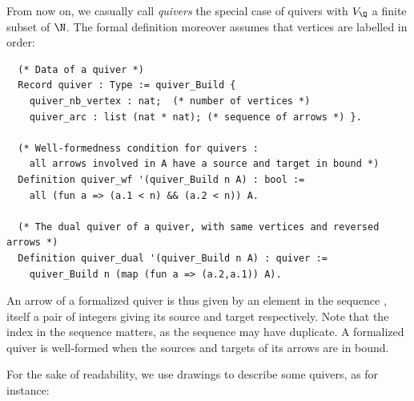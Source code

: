 \documentclass[a4paper,UKenglish,cleveref, autoref, thm-restate]{lipics-v2021}
\begin{document}
From now on, we casually call \emph{quivers} the special case of quivers with $V_\Q$ a finite subset of $\N$. The formal definition moreover assumes that vertices are labelled in order:
\begin{verbatim}
  (* Data of a quiver *)
  Record quiver : Type := quiver_Build {
    quiver_nb_vertex : nat;  (* number of vertices *)
    quiver_arc : list (nat * nat); (* sequence of arrows *) }.

  (* Well-formedness condition for quivers :
    all arrows involved in A have a source and target in bound *)
  Definition quiver_wf '(quiver_Build n A) : bool :=
    all (fun a => (a.1 < n) && (a.2 < n)) A.

  (* The dual quiver of a quiver, with same vertices and reversed arrows *)
  Definition quiver_dual '(quiver_Build n A) : quiver :=
    quiver_Build n (map (fun a => (a.2,a.1)) A).
\end{verbatim}
An arrow of a formalized quiver  is thus given by an element in the sequence , itself a pair of integers giving its source and target respectively. Note that the index in the sequence matters, as the sequence may have duplicate. A formalized quiver is well-formed when the sources and targets of its arrows are in bound.

For the sake of readability, we use drawings to describe some quivers, as for instance:
\begin{figure}[h]
\begin{center}
\end{center}
\end{figure}
\end{document}
